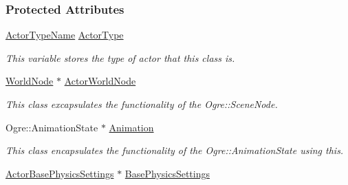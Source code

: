 \subsubsection*{Protected Attributes}
\begin{DoxyCompactItemize}
\item 
\hypertarget{classphys_1_1ActorBase_a42baa3657656300eeefe3ed48f526a00}{
\hyperlink{classphys_1_1ActorBase_aff3a7c464e8ce82576073f8f891434b7}{ActorTypeName} \hyperlink{classphys_1_1ActorBase_a42baa3657656300eeefe3ed48f526a00}{ActorType}}
\label{classphys_1_1ActorBase_a42baa3657656300eeefe3ed48f526a00}

\begin{DoxyCompactList}\small\item\em This variable stores the type of actor that this class is. \item\end{DoxyCompactList}\item 
\hypertarget{classphys_1_1ActorBase_aca423ad9c3d92bb66a624c95b0de8b85}{
\hyperlink{classphys_1_1WorldNode}{WorldNode} $\ast$ \hyperlink{classphys_1_1ActorBase_aca423ad9c3d92bb66a624c95b0de8b85}{ActorWorldNode}}
\label{classphys_1_1ActorBase_aca423ad9c3d92bb66a624c95b0de8b85}

\begin{DoxyCompactList}\small\item\em This class excapsulates the functionality of the Ogre::SceneNode. \item\end{DoxyCompactList}\item 
\hypertarget{classphys_1_1ActorBase_aed2853b0a97e12aa73f6167aa572e5f3}{
Ogre::AnimationState $\ast$ \hyperlink{classphys_1_1ActorBase_aed2853b0a97e12aa73f6167aa572e5f3}{Animation}}
\label{classphys_1_1ActorBase_aed2853b0a97e12aa73f6167aa572e5f3}

\begin{DoxyCompactList}\small\item\em This class encapsulates the functionality of the Ogre::AnimationState using this. \item\end{DoxyCompactList}\item 
\hypertarget{classphys_1_1ActorBase_a07daafcbc37e64936b2eac7c9582c89f}{
\hyperlink{classphys_1_1ActorBasePhysicsSettings}{ActorBasePhysicsSettings} $\ast$ \hyperlink{classphys_1_1ActorBase_a07daafcbc37e64936b2eac7c9582c89f}{BasePhysicsSettings}}
\label{classphys_1_1ActorBase_a07daafcbc37e64936b2eac7c9582c89f}


\end{DoxyCompactItemize}
